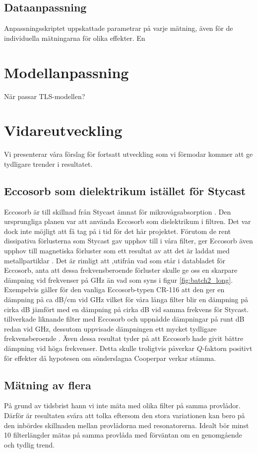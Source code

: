 \documentclass[main.tex]{subfiles}
\begin{document}
\subsection{Dataanpassning}
Anpassningsskriptet uppskattade parametrar på varje mätning, även för de individuella mätningarna för olika effekter. En 
\section{Modellanpassning}
När passar TLS-modellen? 


\section{Vidareutveckling}
Vi presenterar våra förslag för fortsatt utveckling som vi förmodar kommer att ge tydligare trender i resultatet.

\subsection{Eccosorb som dielektrikum istället för Stycast}
Eccosorb är till skillnad från Stycast ämnat för mikrovågsabsorption . Den ursprungliga planen var att använda Eccosorb som dielektrikum i filtren. Det var dock inte möjligt att få tag på i tid för det här projektet. Förutom de rent dissipativa förlusterna som Stycast gav upphov till i våra filter, ger Eccosorb även upphov till magnetiska förluster som ett resultat av att det är laddat med metallpartiklar \cite{Eccosorb}. Det är rimligt att ,utifrån vad som står i databladet för Eccosorb, anta att dessa frekvensberoende förluster skulle ge oss en skarpare dämpning vid frekvenser på \unit[8-50]{GHz} än vad som syns i figur \ref{fig:batch2_long}. Exempelvis gäller för den vanliga Eccosorb-typen CR-116 att den ger en dämpning på ca \unit[57]{dB/cm} vid \unit[18]{GHz} \cite{Eccosorb} vilket för våra långa filter blir en dämpning på cirka \unit[150]{dB} jämfört med en dämpning på cirka \unit[10]{dB} vid samma frekvens för Stycast. \citeauthor{santavicca2008} tillverkade liknande filter med Eccosorb och uppnådde dämpningar på runt \unit[80]{dB} redan vid \unit[10]{GHz}, dessutom uppvisade dämpningen ett mycket tydligare frekvensberoende \cite{santavicca2008}. Även dessa resultat tyder på att Eccosorb hade givit bättre dämpning vid höga frekvenser.    Detta skulle troligtvis påverkar $Q$-faktorn positivt för effekter då hypotesen om sönderslagna Cooperpar verkar stämma.

\subsection{Mätning av flera }
På grund av tidsbrist hann vi inte mäta med olika filter på samma provlådor. Därför är resultaten svåra att tolka eftersom den stora variationen kan bero på den inbördes skillnaden mellan provlådorna med resonatorerna. Idealt bör minst 10 filterlängder mätas på samma provlåda med förväntan om en genomgående och tydlig trend.
\end{document}
